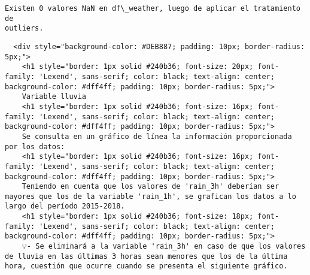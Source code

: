 \documentclass[11pt]{article}
\begin{document}
    \begin{Verbatim}[commandchars=\\\{\}]
Existen 0 valores NaN en df\_weather, luego de aplicar el tratamiento de
outliers.
    \end{Verbatim}

    \begin{verbatim}
  <div style="background-color: #DEB887; padding: 10px; border-radius: 5px;">
    <h1 style="border: 1px solid #240b36; font-size: 20px; font-family: 'Lexend', sans-serif; color: black; text-align: center; background-color: #dff4ff; padding: 10px; border-radius: 5px;">
    Variable lluvia
    <h1 style="border: 1px solid #240b36; font-size: 16px; font-family: 'Lexend', sans-serif; color: black; text-align: center; background-color: #dff4ff; padding: 10px; border-radius: 5px;">
    Se consulta en un gráfico de línea la información proporcionada por los datos:
    <h1 style="border: 1px solid #240b36; font-size: 16px; font-family: 'Lexend', sans-serif; color: black; text-align: center; background-color: #dff4ff; padding: 10px; border-radius: 5px;">
    Teniendo en cuenta que los valores de 'rain_3h' deberían ser mayores que los de la variable 'rain_1h', se grafican los datos a lo largo del período 2015-2018.
    <h1 style="border: 1px solid #240b36; font-size: 18px; font-family: 'Lexend', sans-serif; color: black; text-align: center; background-color: #dff4ff; padding: 10px; border-radius: 5px;">
    💡- Se eliminará a la variable 'rain_3h' en caso de que los valores de lluvia en las últimas 3 horas sean menores que los de la última hora, cuestión que ocurre cuando se presenta el siguiente gráfico.
\end{verbatim}
\end{document}

